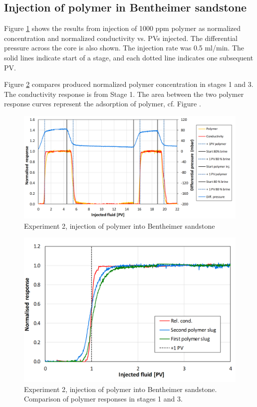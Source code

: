 \subsection{Injection of polymer in Bentheimer sandstone}
Figure \ref{cht:injexp2} shows the results from injection of 1000 ppm polymer as normalized concentration and normalized conductivity vs. PVs injected. The differential pressure across the core is also shown. The injection rate was 0.5 ml/min. The solid lines indicate start of a stage, and each dotted line indicates one subsequent PV. 

Figure \ref{cht:injexp2Comp1-3} compares produced normalized polymer concentration in stages 1 and 3. The conductivity response is from Stage 1. The area between the two polymer response curves represent the adsorption of polymer, cf. Figure .

\begin{figure}[h]
    \centering
    \includegraphics[width=\textwidth]{img/cht/injexp2bent.png}
    \caption{Experiment 2, injection of polymer into Bentheimer sandstone}
    \label{cht:injexp2}
\end{figure}

\begin{figure}[h!   ]
    \centering
    \includegraphics[width=\textwidth]{img/cht/injexp2bentComp1-3.png}
    \caption{Experiment 2, injection of polymer into Bentheimer sandstone. Comparison of polymer responses in stages 1 and 3.}
    \label{cht:injexp2Comp1-3}
\end{figure}



